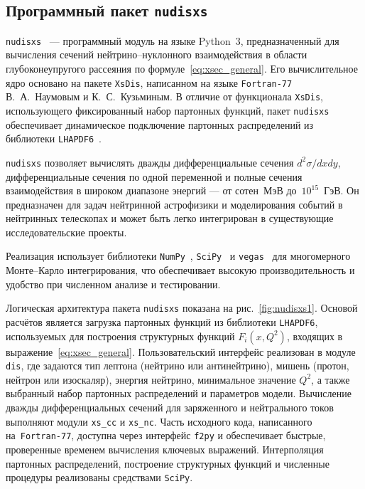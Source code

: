 \subsection{Программный пакет \texttt{nudisxs}}

\texttt{nudisxs}~\cite{nudisxs2022} — программный модуль на языке Python~3, предназначенный для вычисления сечений нейтрино–нуклонного взаимодействия в области глубоконеупругого рассеяния по формуле~\eqref{eq:xsec_general}. 
Его вычислительное ядро основано на пакете \texttt{XsDis}, написанном на языке \texttt{Fortran-77} В.~А.~Наумовым и К.~С.~Кузьминым. 
В отличие от функционала \texttt{XsDis}, использующего фиксированный набор партонных функций, пакет \texttt{nudisxs} обеспечивает динамическое подключение партонных распределений из библиотеки \texttt{LHAPDF6}~\cite{aartsenLHAPDF2020}.

\texttt{nudisxs} позволяет вычислять дважды дифференциальные сечения $d^2\sigma/dx dy$, дифференциальные сечения по одной переменной и полные сечения взаимодействия в широком диапазоне энергий — от сотен~МэВ до~$10^{15}$~ГэВ. 
Он предназначен для задач нейтринной астрофизики и моделирования событий в нейтринных телескопах и может быть легко интегрирован в существующие исследовательские проекты.

Реализация использует библиотеки \texttt{NumPy}~\cite{2020NumPy-Array}, \texttt{SciPy}~\cite{2020SciPy-NMeth} и \texttt{vegas}~\cite{lepageVegas2021} для многомерного Монте–Карло интегрирования, что обеспечивает высокую производительность и удобство при численном анализе и тестировании. 
%

Логическая архитектура пакета \texttt{nudisxs} показана на рис.~\ref{fig:nudisxs1}. 
Основой расчётов является загрузка партонных функций из библиотеки \texttt{LHAPDF6}, используемых для построения структурных функций $F_i(x, Q^2)$, входящих в выражение~\eqref{eq:xsec_general}. 
Пользовательский интерфейс реализован в модуле \texttt{dis}, где задаются тип лептона (нейтрино или антинейтрино), мишень (протон, нейтрон или изоскаляр), энергия нейтрино, минимальное значение $Q^2$, а также выбранный набор партонных распределений и параметров модели. 
Вычисление дважды дифференциальных сечений для заряженного и нейтрального токов выполняют модули \texttt{xs\_cc} и \texttt{xs\_nc}. 
Часть исходного кода, написанного на~\texttt{Fortran-77}, доступна через интерфейс \texttt{f2py} и обеспечивает быстрые, проверенные временем вычисления ключевых выражений. 
Интерполяция партонных распределений, построение структурных функций и численные процедуры реализованы средствами \texttt{SciPy}.

